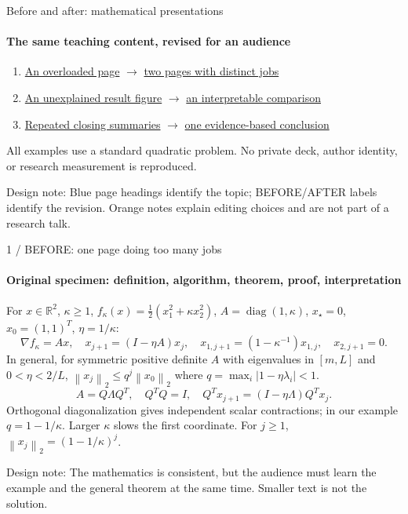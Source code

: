 \documentclass[aspectratio=169,11pt]{beamer}
\newcommand{\norm}[1]{\left\lVert#1\right\rVert_2}
\newcommand{\editnote}[1]{\par\vfill{\scriptsize\color{talkorange}Design note: #1}}
\begin{document}
\begin{frame}[label=route]{Before and after: mathematical presentations}
\framesubtitle{The same teaching content, revised for an audience}
\begin{enumerate}
\item \hyperlink{dense-before}{An overloaded page} $\longrightarrow$ \hyperlink{dense-after}{two pages with distinct jobs}
\item \hyperlink{plot-before}{An unexplained result figure} $\longrightarrow$ \hyperlink{plot-after}{an interpretable comparison}
\item \hyperlink{ending-before}{Repeated closing summaries} $\longrightarrow$ \hyperlink{ending-after}{one evidence-based conclusion}
\end{enumerate}
\vspace{4mm}
\small All examples use a standard quadratic problem. No private deck, author identity, or research measurement is reproduced.
\editnote{Blue page headings identify the topic; BEFORE/AFTER labels identify the revision. Orange notes explain editing choices and are not part of a research talk.}
\end{frame}

\begin{frame}[label=dense-before]{1 / BEFORE: one page doing too many jobs}
\framesubtitle{Original specimen: definition, algorithm, theorem, proof, interpretation}
\small
For $x\in\mathbb R^2$, $\kappa\geq1$, $f_\kappa(x)=\frac12(x_1^2+\kappa x_2^2)$, $A=\operatorname{diag}(1,\kappa)$, $x_\star=0$, $x_0=(1,1)^T$, $\eta=1/\kappa$:
\[
\nabla f_\kappa=Ax,\quad x_{j+1}=(I-\eta A)x_j,\quad
x_{1,j+1}=(1-\kappa^{-1})x_{1,j},\quad x_{2,j+1}=0.
\]
In general, for symmetric positive definite $A$ with eigenvalues in $[m,L]$ and $0<\eta<2/L$, $\norm{x_j}\leq q^j\norm{x_0}$ where $q=\max_i|1-\eta\lambda_i|<1$.
\[
A=Q\Lambda Q^T,\quad Q^TQ=I,\quad
Q^Tx_{j+1}=(I-\eta\Lambda)Q^Tx_j.
\]
Orthogonal diagonalization gives independent scalar contractions; in our example $q=1-1/\kappa$. Larger $\kappa$ slows the first coordinate. For $j\geq1$, $\norm{x_j}=(1-1/\kappa)^j$.
\editnote{The mathematics is consistent, but the audience must learn the example and the general theorem at the same time. Smaller text is not the solution.}
\end{frame}
\end{document}
